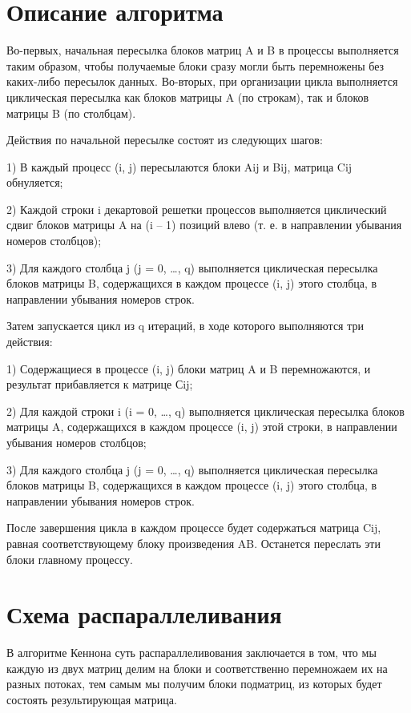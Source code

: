 \documentclass{report}
\begin{document}
\section*{Описание алгоритма}
Во-первых, начальная пересылка блоков матриц A и B в процессы выполняется таким образом, чтобы получаемые блоки сразу могли быть перемножены без каких-либо пересылок данных. Во-вторых, при организации цикла выполняется циклическая пересылка как блоков матрицы A (по строкам), так и блоков матрицы B (по столбцам).

Действия по начальной пересылке состоят из следующих шагов:

\par1) В каждый процесс (i, j) пересылаются блоки Aij и Bij, матрица Cij обнуляется;
\par2) Каждой строки i декартовой решетки процессов выполняется циклический сдвиг блоков матрицы A на (i – 1) позиций влево (т. е. в направлении убывания номеров столбцов);
\par3) Для каждого столбца j (j = 0, …, q) выполняется циклическая пересылка блоков матрицы B, содержащихся в каждом процессе (i, j) этого столбца, в направлении убывания номеров строк.

Затем запускается цикл из q итераций, в ходе которого выполняются три действия:

\par1) Содержащиеся в процессе (i, j) блоки матриц A и B перемножаются, и результат прибавляется к
матрице Сij;

\par2) Для каждой строки i (i = 0, …, q) выполняется циклическая пересылка блоков матрицы A, содержащихся в каждом процессе (i, j) этой строки, в направлении убывания номеров столбцов;

\par3) Для каждого столбца j (j = 0, …, q) выполняется циклическая пересылка блоков матрицы B, содержащихся в каждом процессе (i, j) этого столбца, в направлении убывания номеров строк.

После завершения цикла в каждом процессе будет содержаться матрица Cij, равная соответствующему блоку произведения AB. Останется переслать эти блоки главному процессу.



\section*{Схема распараллеливания}
В алгоритме Кеннона суть распараллеливования заключается в том, что мы каждую из двух матриц делим на блоки и соответственно перемножаем их на разных потоках, тем самым мы получим блоки подматриц, из которых будет состоять результирующая матрица.
\newpage
\end{document}
